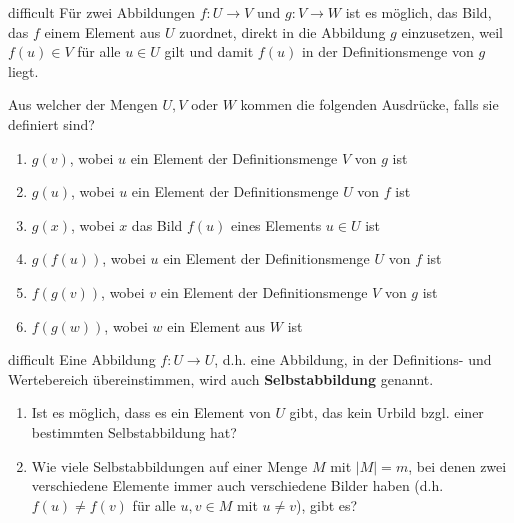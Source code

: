\documentclass[../funktionen.tex]{subfiles}
\begin{document}
\begin{exercise}{difficult}
    Für zwei Abbildungen $f\colon U\rightarrow V$ und $g\colon V\rightarrow W$ ist es möglich, das Bild, das $f$ einem Element aus $U$ zuordnet, direkt in die Abbildung $g$ einzusetzen, weil $f(u)\in V$ für alle $u\in U$ gilt und damit $f(u)$ in der Definitionsmenge von $g$ liegt.
    
    Aus welcher der Mengen $U, V$ oder $W$ kommen die folgenden Ausdrücke, falls sie definiert sind?
        \begin{enumerate}
            \item $g(v)$, wobei $u$ ein Element der Definitionsmenge $V$ von $g$ ist
            \item $g(u)$, wobei $u$ ein Element der Definitionsmenge $U$ von $f$ ist
            \item $g(x)$, wobei $x$ das Bild $f(u)$ eines Elements $u\in U$ ist
            \item $g(f(u))$, wobei $u$ ein Element der Definitionsmenge $U$ von $f$ ist
            \item $f(g(v))$, wobei $v$ ein Element der Definitionsmenge $V$ von $g$ ist
            \item $f(g(w))$, wobei $w$ ein Element aus $W$ ist
        \end{enumerate}
\end{exercise}

\begin{exercise}{difficult}
    Eine Abbildung $f\colon U\rightarrow U$, d.h. eine Abbildung, in der Definitions- und Wertebereich übereinstimmen, wird auch \textbf{Selbstabbildung} genannt.
    
    \begin{enumerate}
        \item Ist es möglich, dass es ein Element von $U$ gibt, das kein Urbild bzgl. einer bestimmten Selbstabbildung hat? 
        \item Wie viele Selbstabbildungen auf einer Menge $M$ mit $|M|=m$, bei denen zwei verschiedene Elemente immer auch verschiedene Bilder haben (d.h. $f(u)\neq f(v)$ für alle $u,v\in M$ mit $u\neq v$), gibt es?
    \end{enumerate}
\end{exercise}
\end{document}
